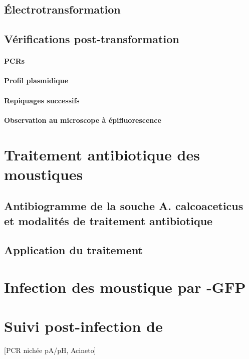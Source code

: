 \subsection{Électrotransformation}

\subsection{Vérifications post-transformation}

\paragraph{PCRs}
\paragraph{Profil plasmidique}
\paragraph{Repiquages successifs}
\paragraph{Observation au microscope à épifluorescence}

\section{Traitement antibiotique des moustiques}

\subsection{Antibiogramme de la souche A. calcoaceticus et modalités de traitement antibiotique}

\subsection{Application du traitement}

\section{Infection des moustique par -GFP}

\section{Suivi post-infection de }

[PCR nichée pA/pH, Acineto]